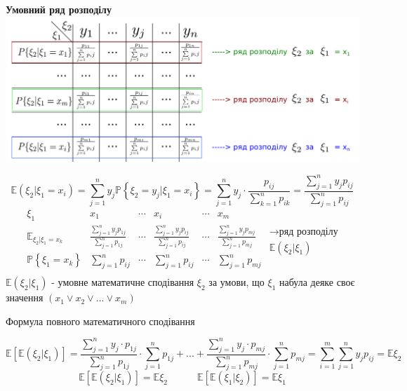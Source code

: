 \begin{center}
\textbf{Умовний ряд розподілу }\includegraphics[scale=0.3]{images/20.png} \end{center}
$$
\mathbb{E}(\xi_2 | \xi_1 = x_i)  =  \sum\limits_{j = 1}^{ n}{ y_j \mathbb{P} \left\lbrace \xi_2 = y_j | \xi_1 = x_i \right\rbrace } =  \sum\limits_{j = 1}^{n}{ y_{j} \cdot \frac{p_{ij} }{  \sum\limits_{k = 1}^{ n}{p_{ik}}}}= \frac{  \sum\limits_{j = 1}^{ n}{ y_j p_{ij}}}{  \sum\limits_{j = 1}^{n}{ p_{ij}}}
$$
$$
\begin{matrix}
	\xi_1 & x_1 & \cdots  &x_i & \cdots & x_m \\
	\mathbb{E}_{\xi_2 | \xi_1=x_k}  &  \frac{  \sum\limits_{j = 1}^{ n}{ y_j p_{1j}}}{  \sum\limits_{j = 1}^{n}{ p_{1j}}}  & \cdots  &\frac{  \sum\limits_{j = 1}^{ n}{ y_j p_{ij}}}{  \sum\limits_{j = 1}^{n}{ p_{ij}}}  & \cdots & \frac{  \sum\limits_{j = 1}^{ n}{ y_j p_{mj}}}{  \sum\limits_{j = 1}^{n}{ p_{mj}}}  \\
	\mathbb{P} \left\lbrace \xi_1 = x_k \right\rbrace &   \sum\limits_{j = 1}^{n}{ p_{ij}} & \cdots  &\sum\limits_{j = 1}^{n}{ p_{ij}} & \cdots & \sum\limits_{j = 1}^{n}{ p_{mj}} \\
\end{matrix}
\begin{gathered}
\longrightarrow \text{ряд розподілу}\\
\mathbb{E}(\xi_2| \xi_1)
\end{gathered}
$$
$
\mathbb{E} (\xi_2 | \xi_1)
$ - умовне математичне сподівання $\xi_2$ за умови, що $\xi_1$ набула деяке своє значення $(x_1 \lor x_2 \lor ... \lor x_m)$
\begin{center}
	Формула повного математичного сподівання
\end{center}
$$
\mathbb{E}[ \mathbb{E} (\xi_2 | \xi_1)] =
\frac{  \sum\limits_{j = 1}^{n}  {y_j \cdot p_{1j}} }   {  \sum\limits_{j = 1}^{ n}{ p_{1j}}} \cdot  \sum\limits_{j = 1}^{ n}{ p_{1j}}+ ... +
\frac{  \sum\limits_{j = 1}^{n}{y_j \cdot p_{mj}} }   {  \sum\limits_{j = 1}^{ n}{ p_{mj}}} \cdot  \sum\limits_{j = 1}^{ n}{ p_{mj}} =  \sum\limits_{i = 1}^{m}{  \sum\limits_{j =1 }^{ n}{ y_j p_{ij}}} = \mathbb{E}\xi_2
$$
$$
\mathbb{E}[ \mathbb{E} (\xi_2 | \xi_1)] = \mathbb{E}  \xi_2  \quad \quad \quad \mathbb{E}[ \mathbb{E} (\xi_1 | \xi_2)] = \mathbb{E}  \xi_1
$$
